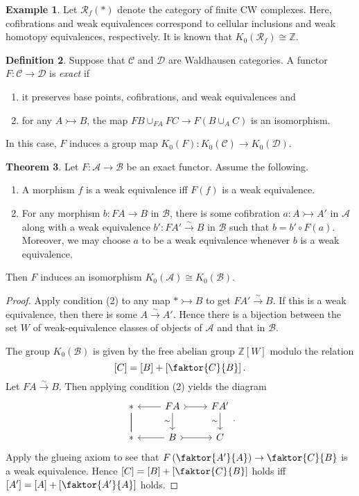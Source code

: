 \documentclass[10pt,letterpaper,cm]{nupset}
\theoremstyle{definition}
\newtheorem{definition}{Definition}[section]
\newtheorem{exmp}[definition]{Example}
\theoremstyle{theorem}
\newtheorem{theorem}[definition]{Theorem}
\theoremstyle{remark}
\newcommand{\Z}{\mathbb Z}
\newcommand{\1}{\mathbf{1}}
\renewcommand{\a}{\mathscr{A}}
\renewcommand{\b}{\mathscr{B}}
\renewcommand{\c}{\mathscr{C}}
\renewcommand{\d}{\mathscr{D}}
\newcommand{\0}{\vec 0}
\begin{document}
\begin{exmp}
Let $\mathcal{R}_f(\ast)$ denote the category of finite CW complexes. Here, cofibrations and weak equivalences correspond to cellular inclusions  and weak homotopy equivalences, respectively. It is known that $K_0(\mathcal{R}_f) \cong \Z$.
\end{exmp}

\begin{definition}
Suppose that $\c$ and $\d$ are Waldhausen categories. A functor $F: \c \to \d$ is \textit{exact} if
\begin{enumerate}[label=(\alph*)] 
\item it preserves base points, cofibrations, and weak equivalences and 
\item for any $A \rightarrowtail B$, the map $FB \cup_{FA} FC \to F(B\cup_A C)$ is an isomorphism. 
\end{enumerate}
\end{definition}

In this case, $F$ induces a group map $K_0(F) :K_0(\c) \to K_0(\d)$.

\begin{theorem}
Let $F : \a \to \b$ be an exact functor. Assume the following.
\begin{enumerate}[label=(\arabic*)]
\item A morphism $f$ is a weak equivalence iff $F(f)$ is a weak equivalence.
\item For any morphism $b : FA \to B$ in $\b$, there is some cofibration $a: A \rightarrowtail A'$ in $\a$ along with a weak equivalence $b' : FA' \overset{\sim}{\longrightarrow} B$ in $\b$ such that $b = b' \circ F(a)$. Moreover, we may choose $a$ to be a weak equivalence whenever $b$ is a weak equivalence.
\end{enumerate}
Then $F$ induces an isomorphism $K_0(\a) \cong K_0(\b)$.
\end{theorem}
\begin{proof}
Apply condition (2) to any map $\ast \rightarrowtail B$ to get $FA' \overset{\sim}{\longrightarrow} B$. If this is a weak equivalence, then there is some $A \overset{\sim}{\longrightarrow} A'$. Hence there is a bijection between the set $W$ of weak-equivalence classes of objects of $\a$ and that in $\b$. 

 The group $K_0(\b)$ is given by the free abelian group $\Z[W]$ modulo the relation $$\left[C\right] = \left[B\right] + \left[\faktor{C}{B}\right].$$ Let $FA \overset{\sim}{\longrightarrow}  B$. Then applying condition (2) yields the diagram
\[
\begin{tikzcd}
\ast \arrow[d, no head] \arrow[d, no head] & FA \arrow[d, "\sim"'] \arrow[r, tail] \arrow[l] & FA' \arrow[d, "\sim"'] \\
\ast & B \arrow[r, tail] \arrow[l] & C
\end{tikzcd}.
\]
Apply the glueing axiom to see that $F\left(\faktor{A'}{A}\right) \to \faktor{C}{B}$ is a weak equivalence. Hence $\left[C\right] = \left[B\right] + \left[\faktor{C}{B}\right]$
 holds iff $\left[A'\right] = \left[A\right] + \left[\faktor{A'}{A}\right]$ holds.
\end{proof}
\end{document}
